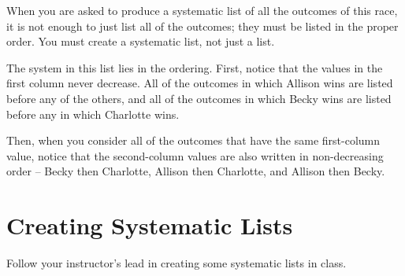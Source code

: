 When you are asked to produce a systematic list of all the outcomes of this race, it is not enough to just list all of the outcomes; they must be listed in the proper order.  You must create a systematic list, not just a list.

The system in this list lies in the ordering.  First, notice that the values in the first column never decrease.  All of the outcomes in which Allison wins are listed before any of the others, and all of the outcomes in which Becky wins are listed before any in which Charlotte wins.

Then, when you consider all of the outcomes that have the same first-column value, notice that the second-column values are also written in non-decreasing order -- Becky then Charlotte, Allison then Charlotte, and Allison then Becky.

\section{Creating Systematic Lists}

Follow your instructor's lead in creating some systematic lists in class.